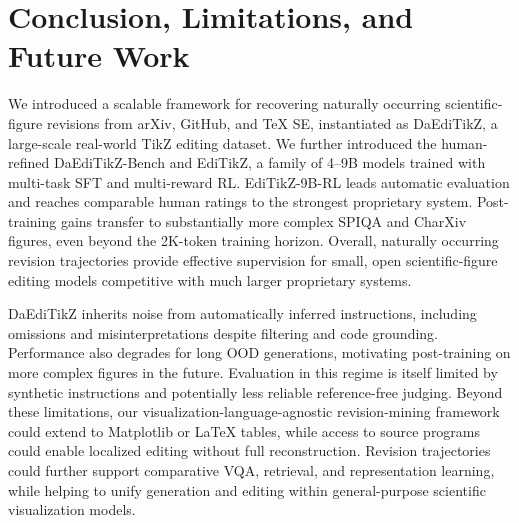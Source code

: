 \section{Conclusion, Limitations, and Future Work}
\label{sec:Conclusion, Limiatations, and Future Work}

We introduced a scalable framework for recovering naturally occurring scientific-figure revisions from arXiv, GitHub, and TeX SE, instantiated as DaEdiTikZ, a large-scale real-world TikZ editing dataset. We further introduced the human-refined DaEdiTikZ-Bench and EdiTikZ, a family of 4--9B models trained with multi-task SFT and multi-reward RL. EdiTikZ-9B-RL leads automatic evaluation and reaches comparable human ratings to the strongest proprietary system. Post-training gains transfer to substantially more complex SPIQA and CharXiv figures, even beyond the 2K-token training horizon. Overall, naturally occurring revision trajectories provide effective supervision for small, open scientific-figure editing models competitive with much larger proprietary systems.

DaEdiTikZ inherits noise from automatically inferred instructions, including omissions and misinterpretations despite filtering and code grounding. Performance also degrades for long OOD generations, motivating post-training on more complex figures in the future. Evaluation in this regime is itself limited by synthetic instructions and potentially less reliable reference-free judging. Beyond these limitations, our visualization-language-agnostic revision-mining framework could extend to Matplotlib or LaTeX tables, while access to source programs could enable localized editing without full reconstruction. Revision trajectories could further support comparative VQA, retrieval, and representation learning, while helping to unify generation and editing within general-purpose scientific visualization models.